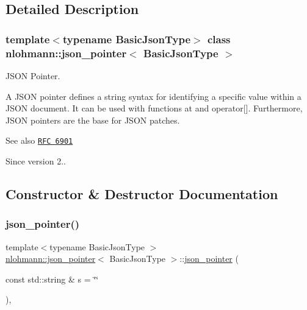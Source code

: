 \subsection{Detailed Description}
\subsubsection*{template$<$typename Basic\+Json\+Type$>$\newline
class nlohmann\+::json\+\_\+pointer$<$ Basic\+Json\+Type $>$}

J\+S\+ON Pointer. 

A J\+S\+ON pointer defines a string syntax for identifying a specific value within a J\+S\+ON document. It can be used with functions {\ttfamily at} and {\ttfamily operator\mbox{[}\mbox{]}}. Furthermore, J\+S\+ON pointers are the base for J\+S\+ON patches.

\begin{DoxySeeAlso}{See also}
\href{https://tools.ietf.org/html/rfc6901}{\tt R\+FC 6901}
\end{DoxySeeAlso}
\begin{DoxySince}{Since}
version 2.. 
\end{DoxySince}


\subsection{Constructor \& Destructor Documentation}
\mbox{\label{classnlohmann_1_1json__pointer_a7f32d7c62841f0c4a6784cf741a6e4f8}} 
\subsubsection{\texorpdfstring{json\+\_\+pointer()}{json\_pointer()}}
{\footnotesize\ttfamily template$<$typename Basic\+Json\+Type $>$ \\
\hyperlink{classnlohmann_1_1json__pointer}{nlohmann\+::json\+\_\+pointer}$<$ Basic\+Json\+Type $>$\+::\hyperlink{classnlohmann_1_1json__pointer}{json\+\_\+pointer} (\begin{DoxyParamCaption}\item[{const std\+::string \&}]{s = {\ttfamily \char`\"{}\char`\"{}} }\end{DoxyParamCaption})\hspace{0.3cm}{\ttfamily [inline]}, {\ttfamily [explicit]}}



